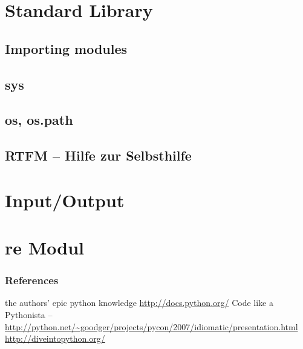 \documentclass{beamer}
\begin{document}
	
\section{Standard Library}
\subsection{Importing modules}
\subsection{sys} 
\subsection{os, os.path} 
\subsection{RTFM -- Hilfe zur Selbsthilfe}  

\section{Input/Output } 

\section{re Modul}


\begin{frame}
	\frametitle{References}
	\begin{thebibliography}{3}
	 the authors' epic python knowledge
	 \url{http://docs.python.org/}
	 Code like a Pythonista -- \url{http://python.net/~goodger/projects/pycon/2007/idiomatic/presentation.html}
	 \url{http://diveintopython.org/}
	\end{thebibliography}
\end{frame}
\end{document}
